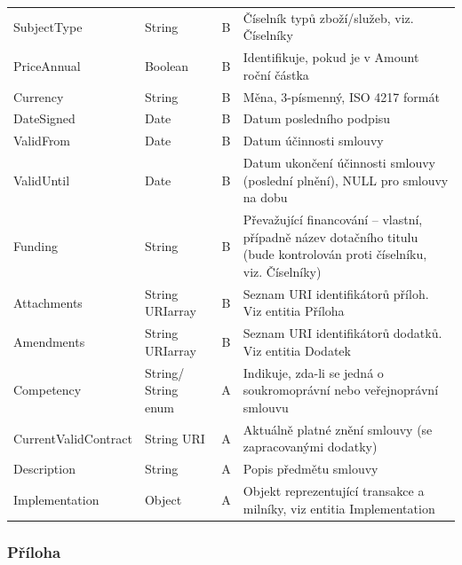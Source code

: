 \begin{center}
\begin{longtable}{lp{20mm}cp{65mm}}
\rowcolor{validateB}SubjectType & String & B & Číselník typů zboží/služeb, viz. Číselníky \\
\rowcolor{validateB}PriceAnnual & Boolean & B & Identifikuje, pokud je v Amount roční částka \\
\rowcolor{validateB}Currency & String & B & Měna, 3-písmenný, ISO 4217 formát \\
\rowcolor{validateB}DateSigned & Date & B & Datum posledního podpisu \\
\rowcolor{validateB}ValidFrom & Date & B & Datum účinnosti smlouvy \\
\rowcolor{validateB}ValidUntil & Date & B & Datum ukončení účinnosti smlouvy (poslední plnění), NULL pro smlouvy na dobu \\
\rowcolor{validateB}Funding & String & B & Převažující financování – vlastní, případně název dotačního titulu (bude kontrolován proti číselníku, viz. Číselníky) \\
\rowcolor{validateB}Attachments & String URIarray & B & Seznam URI identifikátorů příloh. Viz entitia Příloha \\
\rowcolor{validateB}Amendments & String URIarray & B & Seznam URI identifikátorů dodatků. Viz entitia Dodatek \\
\rowcolor{validateA}Competency & String/ String enum & A & Indikuje, zda-li se jedná o soukromoprávní nebo veřejnoprávní smlouvu \\
\rowcolor{validateA}CurrentValidContract & String URI & A & Aktuálně platné znění smlouvy (se zapracovanými dodatky) \\
\rowcolor{validateA}Description & String & A & Popis předmětu smlouvy \\
\rowcolor{validateA}Implementation & Object & A & Objekt reprezentující transakce a milníky, viz entitia Implementation \\
\end{longtable}
\end{center}

\subsubsection*{Příloha}


